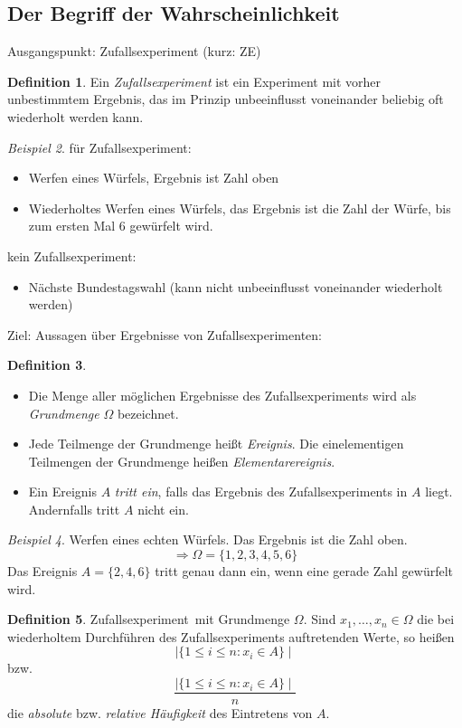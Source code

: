 \documentclass[a4paper,12pt,fleqn]{scrartcl}
\newcommand{\ZE}{Zufallsexperiment}
\newcommand{\impl}{\Rightarrow}
\theoremstyle{definition}
\newtheorem{definition}{Definition}[section]
\theoremstyle{plain}
\theoremstyle{remark}
\newtheorem{beispiel}[definition]{Beispiel}
\begin{document}
\subsection{Der Begriff der Wahrscheinlichkeit}
Ausgangspunkt: Zufallsexperiment (kurz: ZE)
\begin{definition}
Ein \emph{Zufallsexperiment} ist ein Experiment mit vorher unbestimmtem Ergebnis, das im Prinzip unbeeinflusst voneinander beliebig oft wiederholt werden kann.
\end{definition}
\begin{beispiel}
für \ZE:
\begin{itemize}
\item Werfen eines Würfels, Ergebnis ist Zahl oben
\item Wiederholtes Werfen eines Würfels, das Ergebnis ist die Zahl der Würfe, bis zum ersten Mal $6$ gewürfelt wird.
\end{itemize}
kein \ZE:
\begin{itemize}
\item Nächste Bundestagswahl (kann nicht unbeeinflusst voneinander wiederholt werden)
\end{itemize}
\end{beispiel}
Ziel: Aussagen über Ergebnisse von \ZE en:
\begin{definition}
\begin{itemize}
\item Die Menge aller möglichen Ergebnisse des \ZE s wird als \emph{Grundmenge} $\Omega$ bezeichnet.
\item Jede Teilmenge der Grundmenge heißt \emph{Ereignis}. Die einelementigen Teilmengen der Grundmenge heißen \emph{Elementarereignis}.
\item Ein Ereignis $A$ \emph{tritt ein}, falls das Ergebnis des Zufallsexperiments in $A$ liegt. Andernfalls tritt $A$ nicht ein.
\end{itemize}
\end{definition}
\begin{beispiel}
Werfen eines echten Würfels. Das Ergebnis ist die Zahl oben.
\[\impl\Omega=\{ 1,2,3,4,5,6\}\]
Das Ereignis $A=\{ 2,4,6\}$ tritt genau dann ein, wenn eine gerade Zahl gewürfelt wird.
\end{beispiel}
\begin{definition}
\ZE \, mit Grundmenge $\Omega$. Sind $x_1,\ldots,x_n\in\Omega$ die bei wiederholtem Durchführen des \ZE s auftretenden Werte, so heißen
\[\mid \{ 1\leq i\leq n:x_i\in A\}\mid\]
bzw.
\[\frac{\mid \{ 1\leq i\leq n:x_i\in A\}\mid}{n}\]
die \emph{absolute} bzw. \emph{relative Häufigkeit} des Eintretens von $A$.
\end{definition}
\end{document}
